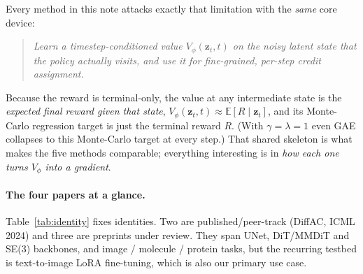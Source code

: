\documentclass[11pt]{article}
\theoremstyle{remark}
\newcommand{\zt}{\bm{z}}
\newcommand{\E}{\mathbb{E}}
\newcommand{\Vphi}{V_\phi}
\begin{document}
Every method in this note attacks exactly that limitation with the \emph{same} core
device:

\begin{quote}
\emph{Learn a timestep-conditioned value $\Vphi(\zt_t, t)$ on the noisy latent state
that the policy actually visits, and use it for fine-grained, per-step credit
assignment.}
\end{quote}

Because the reward is terminal-only, the value at any intermediate state is the
\emph{expected final reward given that state}, $\Vphi(\zt_t,t)\approx\E[R\mid\zt_t]$,
and its Monte-Carlo regression target is just the terminal reward $R$. (With
$\gamma=\lambda=1$ even GAE collapses to this Monte-Carlo target at every step.) That
shared skeleton is what makes the five methods comparable; everything interesting is in
\emph{how each one turns $\Vphi$ into a gradient}.

\paragraph{The four papers at a glance.}
Table~\ref{tab:identity} fixes identities. Two are published/peer-track
(DiffAC, ICML 2024) and three are preprints under review. They span UNet, DiT/MMDiT and
SE(3) backbones, and image / molecule / protein tasks, but the recurring testbed is
text-to-image LoRA fine-tuning, which is also our primary use case.
\end{document}
